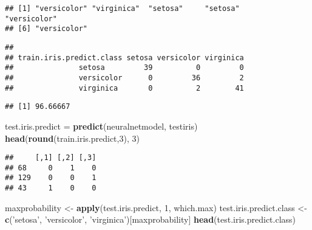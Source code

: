 \documentclass[
]{book}
\newenvironment{Shaded}{\begin{snugshade}}{\end{snugshade}}
\newcommand{\DecValTok}[1]{\textcolor[rgb]{0.00,0.00,0.81}{#1}}
\newcommand{\KeywordTok}[1]{\textcolor[rgb]{0.13,0.29,0.53}{\textbf{#1}}}
\newcommand{\NormalTok}[1]{#1}
\newcommand{\OperatorTok}[1]{\textcolor[rgb]{0.81,0.36,0.00}{\textbf{#1}}}
\newcommand{\StringTok}[1]{\textcolor[rgb]{0.31,0.60,0.02}{#1}}
\begin{document}
\begin{verbatim}
## [1] "versicolor" "virginica"  "setosa"     "setosa"     "versicolor"
## [6] "versicolor"
\end{verbatim}

\begin{Shaded}
\end{Shaded}

\begin{verbatim}
##                         
## train.iris.predict.class setosa versicolor virginica
##               setosa         39          0         0
##               versicolor      0         36         2
##               virginica       0          2        41
\end{verbatim}

\begin{Shaded}
\end{Shaded}

\begin{verbatim}
## [1] 96.66667
\end{verbatim}

\begin{Shaded}
\begin{Highlighting}[]
\NormalTok{test.iris.predict =}\StringTok{ }\KeywordTok{predict}\NormalTok{(neuralnetmodel, testiris)}
\KeywordTok{head}\NormalTok{(}\KeywordTok{round}\NormalTok{(train.iris.predict,}\DecValTok{3}\NormalTok{), }\DecValTok{3}\NormalTok{)}
\end{Highlighting}
\end{Shaded}

\begin{verbatim}
##     [,1] [,2] [,3]
## 68     0    1    0
## 129    0    0    1
## 43     1    0    0
\end{verbatim}

\begin{Shaded}
\begin{Highlighting}[]
\NormalTok{maxprobability <-}\StringTok{ }\KeywordTok{apply}\NormalTok{(test.iris.predict, }\DecValTok{1}\NormalTok{, which.max) }
\NormalTok{test.iris.predict.class <-}\StringTok{ }\KeywordTok{c}\NormalTok{(}\StringTok{'setosa'}\NormalTok{, }\StringTok{'versicolor'}\NormalTok{, }\StringTok{'virginica'}\NormalTok{)[maxprobability] }
\KeywordTok{head}\NormalTok{(test.iris.predict.class)}
\end{Highlighting}
\end{Shaded}
\end{document}
